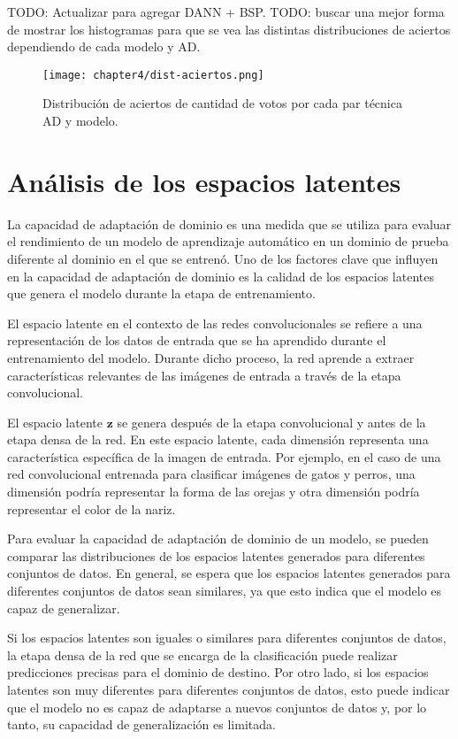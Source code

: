 TODO: Actualizar para agregar DANN + BSP. TODO: buscar una mejor forma de mostrar los histogramas para que se vea las
distintas distribuciones de aciertos dependiendo de cada modelo y AD.
\begin{figure}[H]
    \centering
    \texttt{[image: chapter4/dist-aciertos.png]}
    \caption{Distribuci\'on de aciertos de cantidad de votos por cada par t\'ecnica AD y modelo.}
    \label{fig:distribucion-aciertos}
\end{figure}

\section{Análisis de los espacios latentes}

La capacidad de adaptación de dominio es una medida que se utiliza para evaluar el rendimiento de un modelo de
aprendizaje automático en un dominio de prueba diferente al dominio en el que se entrenó. Uno de los factores clave que
influyen en la capacidad de adaptación de dominio es la calidad de los espacios latentes que genera el modelo durante
la etapa de entrenamiento.

El espacio latente en el contexto de las redes convolucionales se refiere a una representación de los datos de entrada
que se ha aprendido durante el entrenamiento del modelo. Durante dicho proceso, la red aprende a extraer
características relevantes de las imágenes de entrada a través de la etapa convolucional.

El espacio latente $\mathbf{z}$ se genera después de la etapa convolucional y antes de la etapa densa de la red. En
este espacio latente, cada dimensión representa una característica específica de la imagen de entrada. Por ejemplo, en
el caso de una red convolucional entrenada para clasificar imágenes de gatos y perros, una dimensión podría representar
la forma de las orejas y otra dimensión podría representar el color de la nariz.

Para evaluar la capacidad de adaptación de dominio de un modelo, se pueden comparar las distribuciones de los espacios
latentes generados para diferentes conjuntos de datos. En general, se espera que los espacios latentes generados para
diferentes conjuntos de datos sean similares, ya que esto indica que el modelo es capaz de generalizar.

Si los espacios latentes son iguales o similares para diferentes conjuntos de datos, la etapa densa de la red que se
encarga de la clasificación puede realizar predicciones precisas para el dominio de destino. Por otro lado, si los
espacios latentes son muy diferentes para diferentes conjuntos de datos, esto puede indicar que el modelo no es capaz
de adaptarse a nuevos conjuntos de datos y, por lo tanto, su capacidad de generalización es limitada.

